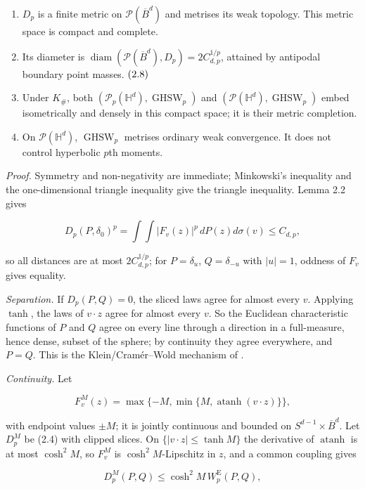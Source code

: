 \documentclass[
  british,
  11pt,
  a4paper,
]{article}
\providecommand{\tightlist}{%
  \setlength{\itemsep}{0pt}\setlength{\parskip}{0pt}}
\begin{document}
\begin{enumerate}
\def\labelenumi{\arabic{enumi}.}
\tightlist
\item
  \(D_p\) is a finite metric on \(\mathcal P(\overline B^d)\) and
  metrises its weak topology. This metric space is compact and complete.
\item
  Its diameter is
  \(\operatorname{diam}(\mathcal P(\overline B^d),D_p)=2C_{d,p}^{1/p}\),
  attained by antipodal boundary point masses. \(\hfill(2.8)\)
\item
  Under \(K_\#\), both
  \((\mathcal P_p(\mathbb H^d),\operatorname{GHSW}_p)\) and
  \((\mathcal P(\mathbb H^d),\operatorname{GHSW}_p)\) embed
  isometrically and densely in this compact space; it is their metric
  completion.
\item
  On \(\mathcal P(\mathbb H^d)\), \(\operatorname{GHSW}_p\) metrises
  ordinary weak convergence. It does not control hyperbolic \(p\)th
  moments.
\end{enumerate}

\emph{Proof.} Symmetry and non-negativity are immediate; Minkowski's
inequality and the one-dimensional triangle inequality give the triangle
inequality. Lemma 2.2 gives

\[
D_p(P,\delta_0)^p=\int\!\int|F_v(z)|^p\,dP(z)d\sigma(v)\leq C_{d,p},
\tag{2.9}
\]

so all distances are at most \(2C_{d,p}^{1/p}\); for \(P=\delta_u\),
\(Q=\delta_{-u}\) with \(|u|=1\), oddness of \(F_v\) gives equality.

\emph{Separation.} If \(D_p(P,Q)=0\), the sliced laws agree for almost
every \(v\). Applying \(\tanh\), the laws of \(v\cdot z\) agree for
almost every \(v\). So the Euclidean characteristic functions of \(P\)
and \(Q\) agree on every line through a direction in a full-measure,
hence dense, subset of the sphere; by continuity they agree everywhere,
and \(P=Q\). This is the Klein/Cramér--Wold mechanism of
\citet{Lyons2014}.

\emph{Continuity.} Let

\[
F_v^M(z)=\max\{-M,\min\{M,\operatorname{atanh}(v\cdot z)\}\},
\tag{2.10}
\]

with endpoint values \(\pm M\); it is jointly continuous and bounded on
\(S^{d-1}\times\overline B^d\). Let \(D_p^M\) be (2.4) with clipped
slices. On \(\{|v\cdot z|\leq\tanh M\}\) the derivative of
\(\operatorname{atanh}\) is at most \(\cosh^2M\), so \(F_v^M\) is
\(\cosh^2M\)-Lipschitz in \(z\), and a common coupling gives

\[
D_p^M(P,Q)\leq\cosh^2M\,W_p^{\mathrm E}(P,Q),
\tag{2.11}
\]
\end{document}
